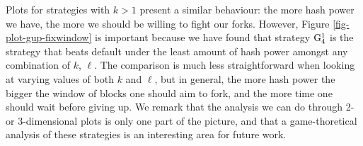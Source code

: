 Plots for strategies with $k > 1$ present a similar behaviour: the more hash power we have, the more we should be willing to fight our forks. However, 
Figure \ref{fig-plot-gup-fixwindow} is important because we have found that strategy ${\rm {G}}^1_4$ is the strategy that beats default under the least amount of hash power 
amongst any combination of $k$, $\ell$. The comparison is much less straightforward when looking at varying values of both $k$ and $\ell$, but in general, 
the more hash power the bigger the window of blocks one should aim to fork, and the more time one should wait before giving up. We remark that the analysis 
we can do through 2- or 3-dimensional plots is only one part of the picture, and that a game-thoretical analysis of these strategies is an interesting area for future work. 



